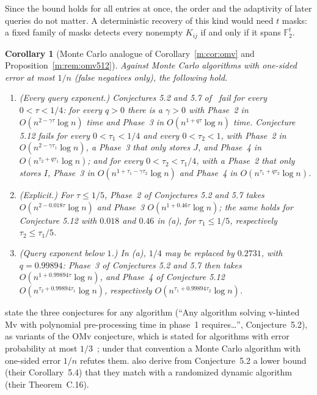\documentclass[11pt]{article}
\newtheorem{corollary}[theorem]{Corollary}
\theoremstyle{definition}
\theoremstyle{remark}
\newcommand{\F}{\mathbb{F}_2}
\newcommand{\HintedOMvMcOurs}{0.2731}%
\newcommand{\CharTwoQ}{0.99894}%
\newcommand{\CharTwoAgamma}{0.018}%
\newcommand{\CharTwoAq}{0.46}%
\begin{document}
Since the bound holds for all entries at once, the order and the adaptivity of later queries do not matter. A deterministic recovery of this kind would need $t$ masks: a fixed family of masks detects every nonempty $K_{ij}$ if and only if it spans $\F^t$.

\begin{corollary}[Monte Carlo analogue of Corollary~\ref{m:cor:omv} and Proposition~\ref{m:rem:omv512}]\label{t:cor:omv}
Against Monte Carlo algorithms with one-sided error at most $1/n$ (false negatives only), the following hold.
\begin{enumerate}[label=(\alph*),nosep]
\item (Every query exponent.) Conjectures 5.2 and 5.7 of~\cite{BNS19} fail for every $0<\tau<1/4$: for every $q>0$ there is a $\gamma>0$ with Phase~2 in $O(n^{2-\gamma\tau}\log n)$ time and Phase~3 in $O(n^{1+q\tau}\log n)$ time. Conjecture 5.12 fails for every $0<\tau_1<1/4$ and every $0<\tau_2<1$, with Phase~2 in $O(n^{2-\gamma\tau_1}\log n)$, a Phase~3 that only stores $J$, and Phase~4 in $O(n^{\tau_2+q\tau_1}\log n)$; and for every $0<\tau_2<\tau_1/4$, with a Phase~2 that only stores $I$, Phase~3 in $O(n^{1+\tau_1-\gamma\tau_2}\log n)$ and Phase~4 in $O(n^{\tau_1+q\tau_2}\log n)$.
\item (Explicit.) For $\tau\le1/5$, Phase~2 of Conjectures 5.2 and 5.7 takes $O(n^{2-\CharTwoAgamma\tau}\log n)$ and Phase~3 $O(n^{1+\CharTwoAq\tau}\log n)$; the same holds for Conjecture 5.12 with $\CharTwoAgamma$ and $\CharTwoAq$ in (a), for $\tau_1\le1/5$, respectively $\tau_2\le\tau_1/5$.
\item (Query exponent below $1$.) In (a), $1/4$ may be replaced by $\HintedOMvMcOurs$, with $q=\CharTwoQ$: Phase~3 of Conjectures 5.2 and 5.7 then takes $O(n^{1+\CharTwoQ\tau}\log n)$, and Phase~4 of Conjecture 5.12 $O(n^{\tau_2+\CharTwoQ\tau_1}\log n)$, respectively $O(n^{\tau_1+\CharTwoQ\tau_2}\log n)$.
\end{enumerate}
\end{corollary}

\cite{BNS19} state the three conjectures for any algorithm (``Any algorithm solving v-hinted Mv with polynomial pre-processing time in phase~1 requires\ldots'', Conjecture~5.2), as variants of the OMv conjecture, which is stated for algorithms with error probability at most $1/3$~\cite[Conjecture~1.1]{HKNS15}; under that convention a Monte Carlo algorithm with one-sided error $1/n$ refutes them. \cite{BNS19} also derive from Conjecture~5.2 a lower bound (their Corollary~5.4) that they match with a randomized dynamic algorithm (their Theorem~C.16).
\end{document}
